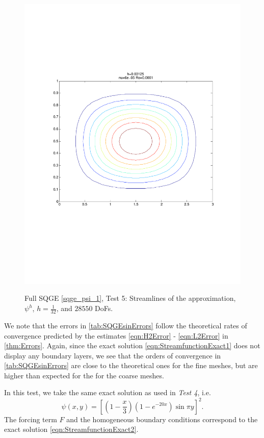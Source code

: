 \begin{figure}%
  \begin{center}
    \includegraphics[trim=0 200 20 215, clip=true, scale=0.5]{SQGEsin.pdf}
    \label{fig:SQGEsin}
    \caption{Full SQGE \eqref{sqge_psi_1}, Test 5: Streamlines of the approximation,
    $\psi^h$, $h=\frac{1}{32}$, and $28550$ DoFs.}
  \end{center}
\end{figure}

We note that the errors in \autoref{tab:SQGEsinErrors} follow the theoretical rates of convergence
predicted by the estimates \eqref{eqn:H2Error} - \eqref{eqn:L2Error} in \autoref{thm:Errors}. Again,
since the exact solution \eqref{eqn:StreamfunctionExact1} does not display any boundary layers, we
see that the orders of convergence in \autoref{tab:SQGEsinErrors} are close to the theoretical ones for the fine meshes, but are higher
than expected for the for the coarse meshes.

In this test, we take the same exact solution as used in \emph{Test 4}, i.e.
\begin{equation}
  \psi(x,y) = \left[\left(1 - \frac{x}{3}\right)\left(1-e^{-20x}\right) \sin \pi y\right]^2.
  \label{eqn:StreamfunctionExact2}
\end{equation}
The forcing term $F$ and the homogeneous boundary conditions correspond to the exact solution
\eqref{eqn:StreamfunctionExact2}.

